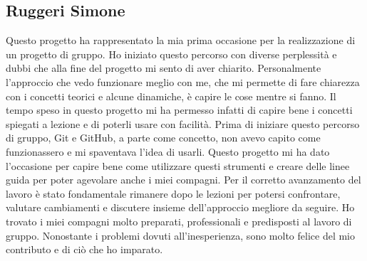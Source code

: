 \documentclass[a4paper,12pt]{report}
\begin{document}
\subsection{Ruggeri Simone}
Questo progetto ha rappresentato la mia prima occasione per la realizzazione di un progetto di gruppo. Ho iniziato questo percorso con diverse perplessità e dubbi
che alla fine del progetto mi sento di aver chiarito. Personalmente l'approccio che vedo funzionare meglio con me, che mi permette di fare chiarezza con i concetti
teorici e alcune dinamiche, è capire le cose mentre si fanno. Il tempo speso in questo progetto mi ha permesso infatti di capire bene i concetti spiegati a lezione e
di poterli usare con facilità. Prima di iniziare questo percorso di gruppo, Git e GitHub, a parte come concetto, non avevo capito come funzionassero e mi spaventava
l'idea di usarli. Questo progetto mi ha dato l'occasione per capire bene come utilizzare questi strumenti e creare delle linee guida per poter agevolare anche i miei
compagni. Per il corretto avanzamento del lavoro è stato fondamentale rimanere dopo le lezioni per potersi confrontare, valutare cambiamenti e discutere insieme
dell'approccio megliore da seguire. Ho trovato i miei compagni molto preparati, professionali e predisposti al lavoro di gruppo. Nonostante i problemi dovuti
all'inesperienza, sono molto felice del mio contributo e di ciò che ho imparato.
\end{document}
